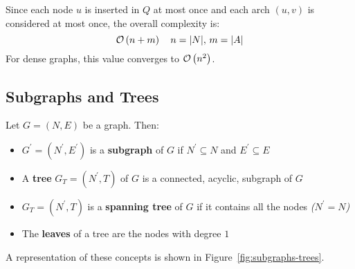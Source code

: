 \documentclass[english]{article}
\begin{document}
Since each node \(u\) is inserted in \(Q\) at most once and each arch \((u,v)\) is considered at most once, the overall complexity is:
\[ \mathcal{O}\left(n+m\right) \quad n = |N|, \, m =|A|\]
For dense graphs, this value converges to \(\mathcal{O}\left(n^2\right)\).

\subsection{Subgraphs and Trees}

Let \(G = (N, E)\) be a graph.
Then:

\begin{itemize}
  \item \(G^\prime = (N^\prime, E^\prime)\) is a \textbf{subgraph} of \(G\) if \(N^\prime \subseteq N\) and \(E^\prime \subseteq E\)
  \item A \textbf{tree} \(G_T = (N^\prime, T)\) of \(G\) is a connected, acyclic, subgraph of \(G\)
  \item \(G_T = (N^\prime, T)\) is a \textbf{spanning tree} of \(G\) if it contains all the nodes \textit{(\(N^\prime = N\))}
  \item The \textbf{leaves} of a tree are the nodes with degree \(1\)
\end{itemize}

\bigskip
A representation of these concepts is shown in Figure~\ref{fig:subgraphs-trees}.
\end{document}
